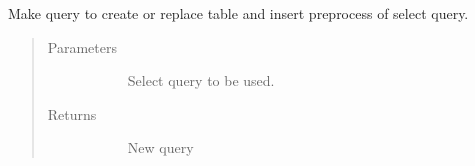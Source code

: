 \documentclass[letterpaper,10pt,english]{sphinxmanual}
\begin{document}
\begin{fulllineitems}
\label{\detokenize{autoapi/src/utils/snowflake/index:src.utils.snowflake.create_table_query}}
Make query to create or replace table and insert preprocess of select query.
\begin{quote}\begin{description}
\item[{Parameters}] \leavevmode\begin{description}
\item[{}] \leavevmode{[}\sphinxhref{https://docs.python.org/3/library/stdtypes.html\#str}{\sphinxcode{\sphinxupquote{str}}}{]}
Select query to be used.

\end{description}

\item[{Returns}] \leavevmode\begin{description}
\item[{}] \leavevmode
New query

\end{description}

\end{description}\end{quote}

\end{fulllineitems}

\end{document}
